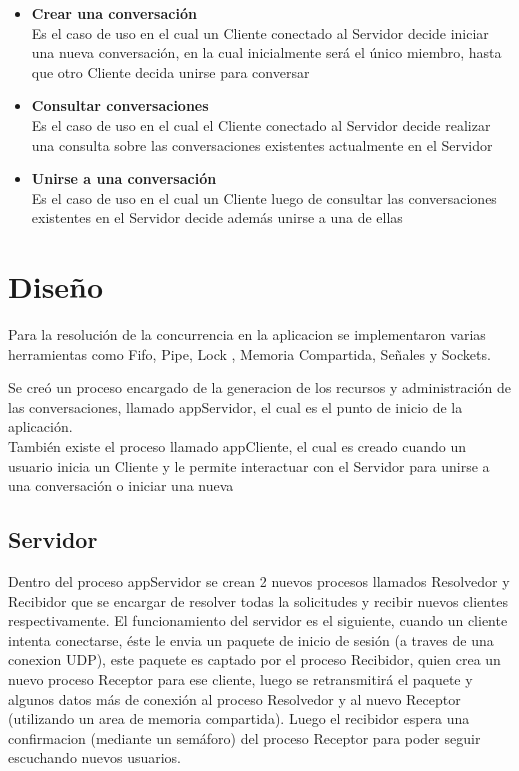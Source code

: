 \documentclass[a4paper,12pt,titlepage]{article}
\begin{document}
\begin{itemize}
\item \textbf{Crear una conversación}\\ 
  Es el caso de uso en el cual un Cliente conectado al Servidor decide iniciar una nueva conversación, en la cual inicialmente
  será el único miembro, hasta que otro Cliente decida unirse para conversar
\item \textbf{Consultar conversaciones}\\
  Es el caso de uso en el cual el Cliente conectado al Servidor decide realizar una consulta sobre las conversaciones
  existentes actualmente en el Servidor
\item \textbf{Unirse a una conversación}\\
  Es el caso de uso en el cual un Cliente luego de consultar las conversaciones existentes en el Servidor decide además
  unirse a una de ellas\\
\end{itemize} 


\newpage
\section{Diseño}

Para la resolución de la concurrencia en la aplicacion se implementaron varias herramientas como Fifo, Pipe, Lock , 
Memoria Compartida, Señales y Sockets.

Se creó un proceso encargado de la generacion de los recursos y administración de las conversaciones, llamado 
appServidor, el cual es el punto de inicio de la aplicación.\\

También existe el proceso llamado appCliente, el cual es creado cuando un usuario inicia un Cliente y le permite interactuar con
el Servidor para unirse a una conversación o iniciar una nueva\\

\subsection{Servidor}
Dentro del proceso appServidor se crean 2 nuevos procesos llamados Resolvedor y Recibidor que se encargar de resolver todas la solicitudes 
y recibir nuevos clientes respectivamente.
El funcionamiento del servidor es el siguiente, cuando un cliente intenta conectarse, éste le envia un paquete de inicio de sesión (a traves 
de una conexion UDP), este paquete es captado por el proceso Recibidor, quien crea un nuevo proceso Receptor para ese cliente, luego 
se retransmitirá el paquete y algunos datos más de conexión al proceso Resolvedor y al nuevo Receptor (utilizando un area de memoria compartida). 
Luego el recibidor espera una confirmacion (mediante un semáforo) del proceso Receptor para poder seguir escuchando nuevos usuarios.\\
\end{document}
